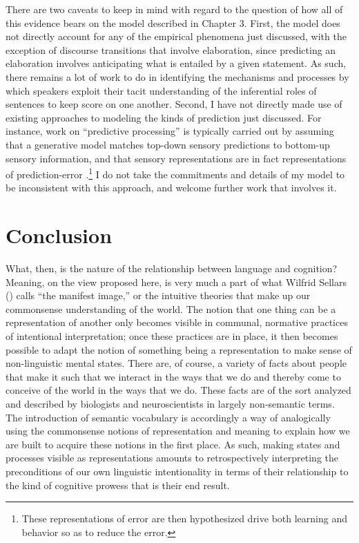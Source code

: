 There are two caveats to keep in mind with regard to the question of how all of this evidence bears on the model described in Chapter 3. First, the model does not directly account for any of the empirical phenomena just discussed, with the exception of discourse transitions that involve elaboration, since predicting an elaboration involves anticipating what is entailed by a given statement. As such, there remains a lot of work to do in identifying the mechanisms and processes by which speakers exploit their tacit understanding of the inferential roles of sentences to keep score on one another. Second, I have not directly made use of existing approaches to modeling the kinds of prediction just discussed. For instance, work on ``predictive processing'' is typically carried out by assuming that a generative model matches top-down sensory predictions to bottom-up sensory information, and that sensory representations are in fact representations of prediction-error \citep{clark:2013}.\footnote{These representations of error are then hypothesized drive both learning and behavior so as to reduce the error.} I do not take the commitments and details of my model to be inconsistent with this approach, and welcome further work that involves it.

\section{Conclusion}

What, then, is the nature of the relationship between language and cognition? Meaning, on the view proposed here, is very much a part of what Wilfrid Sellars (\citeyear{Sellars:1963}) calls ``the manifest image,'' or the intuitive theories that make up our commonsense understanding of the world. The notion that one thing can be a representation of another only becomes visible in communal, normative practices of intentional interpretation; once these practices are in place, it then becomes possible to adapt the notion of something being a representation to make sense of non-linguistic mental states. There are, of course, a variety of facts about people that make it such that we interact in the ways that we do and thereby come to conceive of the world in the ways that we do. These facts are of the sort analyzed and described by biologists and neuroscientists in largely non-semantic terms. The introduction of semantic vocabulary is accordingly a way of analogically using the commonsense notions of representation and meaning to explain how we are built to acquire these notions in the first place. As such, making states and processes visible as representations amounts to retrospectively interpreting the preconditions of our own linguistic intentionality in terms of their relationship to the kind of cognitive prowess that is their end result.